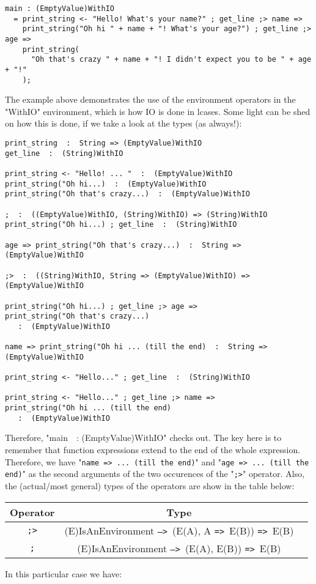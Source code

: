 \documentclass{article}
\def\ra{\texttt{=>}\ }
\def\Ra{\texttt{-->}\ }
\begin{document}
\begin{verbatim}
main : (EmptyValue)WithIO
  = print_string <- "Hello! What's your name?" ; get_line ;> name =>
    print_string("Oh hi " + name + "! What's your age?") ; get_line ;> age =>
    print_string(
      "Oh that's crazy " + name + "! I didn't expect you to be " + age + "!"
    );
\end{verbatim}
The example above demonstrates the use of the environment operators in the 
"WithIO" environment, which is how IO is done in lcases. Some light can be shed
on how this is done, if we take a look at the types (as always!):
\begin{verbatim}
print_string  :  String => (EmptyValue)WithIO
get_line  :  (String)WithIO

print_string <- "Hello! ... "  :  (EmptyValue)WithIO
print_string("Oh hi...)  :  (EmptyValue)WithIO
print_string("Oh that's crazy...)  :  (EmptyValue)WithIO

;  :  ((EmptyValue)WithIO, (String)WithIO) => (String)WithIO 
print_string("Oh hi...) ; get_line  :  (String)WithIO

age => print_string("Oh that's crazy...)  :  String => (EmptyValue)WithIO

;>  :  ((String)WithIO, String => (EmptyValue)WithIO) => (EmptyValue)WithIO 

print_string("Oh hi...) ; get_line ;> age =>
print_string("Oh that's crazy...)
   :  (EmptyValue)WithIO

name => print_string("Oh hi ... (till the end)  :  String => (EmptyValue)WithIO

print_string <- "Hello..." ; get_line  :  (String)WithIO

print_string <- "Hello..." ; get_line ;> name =>
print_string("Oh hi ... (till the end)
   :  (EmptyValue)WithIO
\end{verbatim}
Therefore, "main\ \ : (EmptyValue)WithIO" checks out.  The key here is to remember
that function expressions extend to the end of the whole expression. Therefore,
we have "\texttt{name => ... (till the end)}" and "\texttt{age => ... (till the
end)}" as the second arguments of the two occurences of the "\texttt{;>}"
operator. Also, the (actual/most general) types of the operators are show in
the table below:

\begin{center}
\begin{tabular}{ |c|c|c| } 
\hline
Operator & Type \\ 
\hline
\hline
\texttt{;>} & (E)IsAnEnvironment \Ra (E(A), A \ra E(B)) \ra E(B) \\
\hline
\texttt{;} & (E)IsAnEnvironment \Ra (E(A), E(B)) \ra E(B) \\
\hline
\end{tabular}
\end{center}
In this particular case we have:
\end{document}
